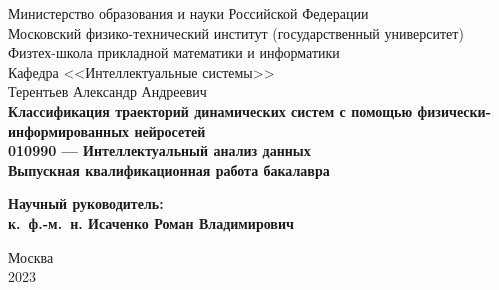\documentclass[a4paper, 12pt]{article}
\begin{document}
	
	\thispagestyle{empty}
	\begin{center}
		\sc
		Министерство образования и науки Российской Федерации\\
		Московский физико-технический институт
		{\rm(государственный университет)}\\
		Физтех-школа прикладной математики и информатики\\
		Кафедра <<Интеллектуальные системы>>\\[35mm]
		\rm\large
		Терентьев Александр Андреевич\\[10mm]
		\bf\Large
		Классификация траекторий динамических систем с помощью физически-информированных нейросетей \\[10mm]
		\rm\normalsize
		010990 --- Интеллектуальный анализ данных\\[10mm]
		\sc
		Выпускная квалификационная работа бакалавра\\[10mm]
	\end{center}
	\hfill\parbox{80mm}{
		\begin{flushleft}
			\bf
			Научный руководитель:\\
			\rm
			к.~ф.-м.~н. 	
Исаченко Роман Владимирович\\[5cm]
		\end{flushleft}
	}
	\begin{center}
		Москва\\
		2023
	\end{center}
	
	\newpage
	\tableofcontents
	\newpage
	
\end{document}
